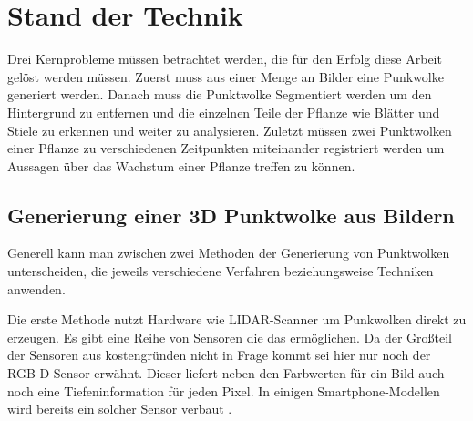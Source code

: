 \documentclass[12pt,titlepage, twoside]{article}
\begin{document}
\newpage
\section{Stand der Technik}
\label{sec:stand}
%

Drei Kernprobleme müssen betrachtet werden, die für den Erfolg diese Arbeit gelöst werden müssen. 
Zuerst muss aus einer Menge an Bilder eine Punkwolke generiert werden. Danach muss die Punktwolke Segmentiert werden um den Hintergrund zu entfernen und die einzelnen Teile der Pflanze wie Blätter und Stiele zu erkennen und weiter zu analysieren. 
Zuletzt müssen zwei Punktwolken einer Pflanze zu verschiedenen Zeitpunkten miteinander registriert werden um Aussagen über das Wachstum einer Pflanze treffen zu können.

\subsection{Generierung einer 3D Punktwolke aus Bildern}
\label{sec:stand:pointcloud}

Generell kann man zwischen zwei Methoden der Generierung von Punktwolken unterscheiden, die jeweils verschiedene Verfahren beziehungsweise Techniken anwenden.

Die erste Methode nutzt Hardware wie LIDAR-Scanner \cite{lidar} um Punkwolken direkt zu erzeugen. Es gibt eine Reihe von Sensoren die das ermöglichen. Da der Großteil der Sensoren aus kostengründen nicht in Frage kommt sei hier nur noch der RGB-D-Sensor erwähnt. 
Dieser liefert neben den Farbwerten für ein Bild auch noch eine Tiefeninformation für jeden Pixel. In einigen Smartphone-Modellen wird bereits ein solcher Sensor verbaut \cite{rgbd_smartphones}.
\end{document}
